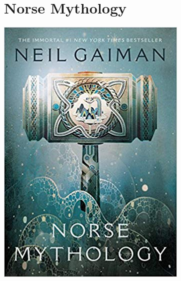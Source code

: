 \documentclass{tufte-handout}
\makeatletter
\newcommand{\varcaption}[2][0pt]{%
  \gsetlength{\@tufte@caption@vertical@offset}{-#1}%
  \gdef\@tufte@stored@varcaption{#2}%
}
\gdef\@tufte@stored@varcaption{} %
\makeatother
\begin{document}
\section*{Norse Mythology}
\begin{marginfigure}[2\baselineskip]
   \includegraphics[width=\linewidth]{images/norse_mythology.jpg}
   \varcaption{\href{https://wwnorton.com/books/9780393356182}{Publisher Link}, \href{https://www.amazon.com/Norse-Mythology-Neil-Gaiman/dp/0393356183/}{Amazon Link}}
\end{marginfigure}
\end{document}
